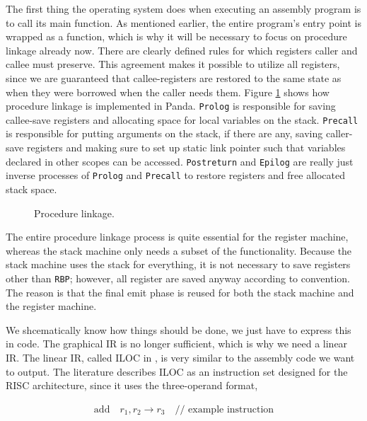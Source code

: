 The first thing the operating system does when executing an assembly program is to call its main function. As mentioned earlier, the entire program's entry point is wrapped as a function, which is why it will be necessary to focus on procedure linkage already now. There are clearly defined rules for which registers caller and callee must preserve. This agreement makes it possible to utilize all registers, since we are guaranteed that callee-registers are restored to the same state as when they were borrowed when the caller needs them. Figure \ref{fig:procedure} shows how procedure linkage is implemented in Panda. \texttt{Prolog} is responsible for saving callee-save registers and allocating space for local variables on the stack. \texttt{Precall} is responsible for putting arguments on the stack, if there are any, saving caller-save registers and making sure to set up static link pointer such that variables declared in other scopes can be accessed. \texttt{Postreturn} and \texttt{Epilog} are really just inverse processes of \texttt{Prolog} and \texttt{Precall} to restore registers and free allocated stack space.

\begin{figure}[H]
    \centering
    
    \caption{Procedure linkage.} 
    \label{fig:procedure}
\end{figure}

The entire procedure linkage process is quite essential for the register machine, whereas the stack machine only needs a subset of the functionality. Because the stack machine uses the stack for everything, it is not necessary to save registers other than \texttt{RBP}; however, all register are saved anyway according to convention. The reason is that the final emit phase is reused for both the stack machine and the register machine.

We shcematically know how things should be done, we just have to express this in code. The graphical IR is no longer sufficient, which is why we need a linear IR. The linear IR, called ILOC in \cite[19]{EnginneringACompiler}, is very similar to the assembly code we want to output. The literature describes ILOC as an instruction set designed for the RISC architecture, since it uses the three-operand format,

\begin{align*}
\mathrm{add} \quad r_1, r_2 \rightarrow r_3 \quad \text{// example instruction}
\end{align*}

